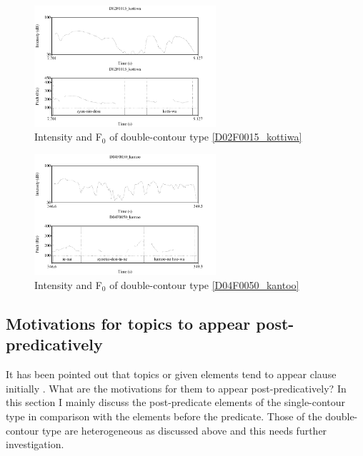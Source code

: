 \begin{figure}
	\begin{center}
	\includegraphics[width=0.6\textwidth]{sounds/D02F0015_kottiwa.pdf}
	\caption{Intensity and F$_{0}$ of double-contour type \ref{D02F0015_kottiwa}}
	\label{D02F0015_kottiwaF}
	\end{center}
\end{figure}
\begin{figure}
	\begin{center}
	\includegraphics[width=0.6\textwidth]{sounds/D04F0050_kantoo.pdf}
	\caption{Intensity and F$_{0}$ of double-contour type \ref{D04F0050_kantoo}}
	\label{D04F0050_kantooF}
	\end{center}
\end{figure}



\subsection{Motivations for topics to appear post-predicatively}\label{WO:PostP:Motivations}

It has been pointed out that
topics or given elements tend to appear clause initially \cite{mathesius28,firbas64,danes70}.
What are the motivations for them to appear post-predicatively?
In this section I mainly discuss the post-predicate elements of the single-contour type in comparison with the elements before the predicate.
Those of the double-contour type are heterogeneous as discussed above and this needs further investigation.


